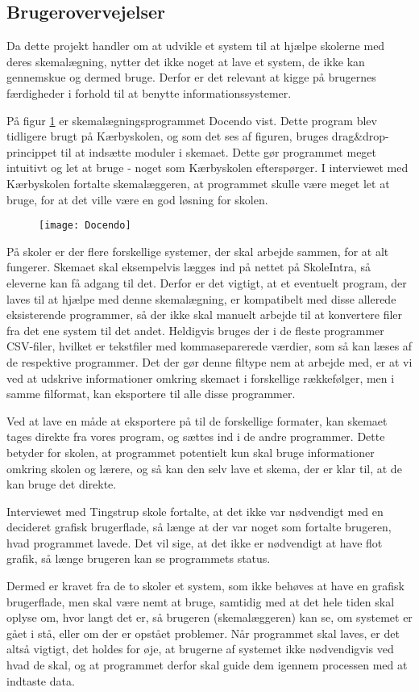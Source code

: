 \subsection{Brugerovervejelser}
\label{brugerovervejelser}
Da dette projekt handler om at udvikle et system til at hjælpe skolerne med deres skemalægning, nytter det ikke noget at lave et system, de ikke kan gennemskue og dermed bruge. Derfor er det relevant at kigge på brugernes færdigheder i forhold til at benytte informationssystemer.

På figur \ref{fig:docendo_skema} er skemalægningsprogrammet Docendo vist. Dette program blev tidligere brugt på Kærbyskolen, og som det ses af figuren, bruges drag\&drop-princippet til at indsætte moduler i skemaet. Dette gør programmet meget intuitivt og let at bruge - noget som Kærbyskolen efterspørger. I interviewet med Kærbyskolen fortalte skemalæggeren, at programmet skulle være meget let at bruge, for at det ville være en god løsning for skolen.

\begin{figure}[h!]
	\centering
	\texttt{[image: Docendo]}
	\label{fig:docendo_skema}
\end{figure}

På skoler er der flere forskellige systemer, der skal arbejde sammen, for at alt fungerer. Skemaet skal eksempelvis lægges ind på nettet på SkoleIntra, så eleverne kan få adgang til det. Derfor er det vigtigt, at et eventuelt program, der laves til at hjælpe med denne skemalægning, er kompatibelt med disse allerede eksisterende programmer, så der ikke skal manuelt arbejde til at konvertere filer fra det ene system til det andet. Heldigvis bruges der i de fleste programmer CSV-filer, hvilket er tekstfiler med kommaseparerede værdier, som så kan læses af de respektive programmer. Det der gør denne filtype nem at arbejde med, er at vi ved at udskrive informationer omkring skemaet i forskellige rækkefølger, men i samme filformat, kan eksportere til alle disse programmer.

Ved at lave en måde at eksportere på til de forskellige formater, kan skemaet tages direkte fra vores program, og sættes ind i de andre programmer. Dette betyder for skolen, at programmet potentielt kun skal bruge informationer omkring skolen og lærere, og så kan den selv lave et skema, der er klar til, at de kan bruge det direkte.

Interviewet med Tingstrup skole fortalte, at det ikke var nødvendigt med en decideret grafisk brugerflade, så længe at der var noget som fortalte brugeren, hvad programmet lavede. Det vil sige, at det ikke er nødvendigt at have flot grafik, så længe brugeren kan se programmets status. 

Dermed er kravet fra de to skoler et system, som ikke behøves at have en grafisk brugerflade, men skal være nemt at bruge, samtidig med at det hele tiden skal oplyse om, hvor langt det er, så brugeren (skemalæggeren) kan se, om systemet er gået i stå, eller om der er opstået problemer. Når programmet skal laves, er det altså vigtigt, det holdes for øje, at brugerne af systemet ikke nødvendigvis ved hvad de skal, og at programmet derfor skal guide dem igennem processen med at indtaste data.